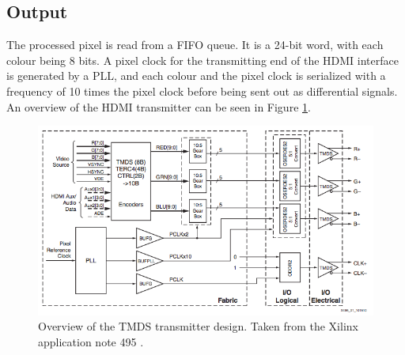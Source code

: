 \subsection{Output}
The processed pixel is read from a FIFO queue. It is a 24-bit word, with each colour being 8 bits.
A pixel clock for the transmitting end of the HDMI interface is generated by a PLL,
and each colour and the pixel clock is serialized with a frequency of 10 times the pixel clock before being sent out as differential signals.
An overview of the HDMI transmitter can be seen in Figure \ref{fig:TMDSTransmitter}.

\begin{figure}[h!]
    \centering
    \includegraphics[width=\linewidth]{img/TMDStransmitterdesign.png}
    \caption[Overview of the TMDS transmitter design.]{Overview of the TMDS transmitter design. Taken from the Xilinx application note 495 \cite{xapp495}.}
    \label{fig:TMDSTransmitter}
\end{figure}
